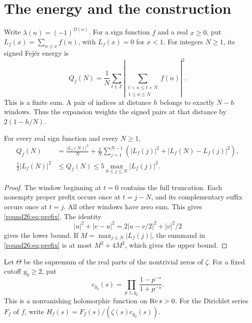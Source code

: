 \section{The energy and the construction}

Write $\lambda(n)=(-1)^{\Omega(n)}$. For a sign function $f$ and a real
$x\ge0$, put $L_f(x)=\sum_{n\le x}f(n)$, with $L_f(x)=0$ for $x<1$.
For integers $N\ge1$, its signed Fej\'er energy is
\[
 Q_f(N)=\frac1N\sum_{t\in\mathbb Z}
     \left|\sum_{\substack{t<n\le t+N\\1\le n\le N}} f(n)\right|^2.
\]
This is a finite sum. A pair of indices at distance $h$ belongs to
exactly $N-h$ windows. Thus the expansion weights the signed pairs
at that distance by $2(1-h/N)$.

\begin{lemma}\label{round26:lem:prefix}
For every real sign function and every $N\ge1$,
\begin{align}
 Q_f(N)&=\frac{|L_f(N)|^2}{N}
  +\frac1N\sum_{j=1}^{N-1}
     \left(|L_f(j)|^2+|L_f(N)-L_f(j)|^2\right),\label{round26:eq:prefix}\\
 \frac12|L_f(N)|^2&\le Q_f(N)
      \le5\max_{0\le j\le N}|L_f(j)|^2.\label{round26:eq:prefix-ineq}
\end{align}
\end{lemma}
\begin{proof}
The window beginning at $t=0$ contains the full truncation. Each
nonempty proper prefix occurs once at $t=j-N$, and its complementary
suffix occurs once at $t=j$. All other windows have zero sum.
This gives \eqref{round26:eq:prefix}. The identity
\[
 |u|^2+|v-u|^2=2|u-v/2|^2+|v|^2/2
\]
gives the lower bound. If $M=\max_{j\le N}|L_f(j)|$, the summand in
\eqref{round26:eq:prefix} is at most $M^2+4M^2$, which gives the upper bound.
\end{proof}

Let $\Theta$ be the supremum of the real parts of the nontrivial
zeros of $\zeta$. For a fixed cutoff $y_0\ge2$, put
\[
 c_{y_0}(s)=\prod_{p\le y_0}\frac{1-p^{-s}}{1+p^{-s}}.
\]
This is a nonvanishing holomorphic function on $\operatorname{Re} s>0$.
For the Dirichlet series $F_f$ of $f$, write
$H_f(s)=F_f(s)/(\zeta(s)c_{y_0}(s))$.

